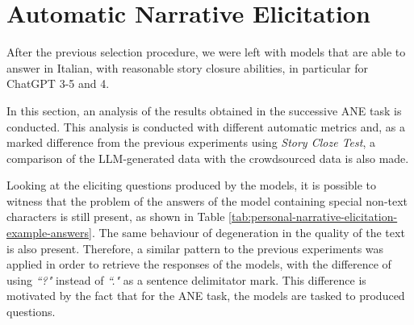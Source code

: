 \section{Automatic Narrative Elicitation}
\label{cha:methodology-personal-narrative-elicitation-results}
After the previous selection procedure, we were left with models that are able to answer in Italian, with reasonable story closure abilities, in particular for ChatGPT 3-5 and 4.

In this section, an analysis of the results obtained in the successive ANE task is conducted. This analysis is conducted with different automatic metrics and, as a marked difference from the previous experiments using \emph{Story Cloze Test}, a comparison of the LLM-generated data with the crowdsourced data is also made.


Looking at the eliciting questions produced by the models, it is possible to witness that the problem of the answers of the model containing special non-text characters is still present, as shown in Table \ref{tab:personal-narrative-elicitation-example-answers}. The same behaviour of degeneration in the quality of the text is also present. Therefore, a similar pattern to the previous experiments was applied in order to retrieve the responses of the models, with the difference of using \emph{``?"} instead of \emph{``."} as a sentence delimitator mark. This difference is motivated by the fact that for the ANE task, the models are tasked to produced questions.
% 


